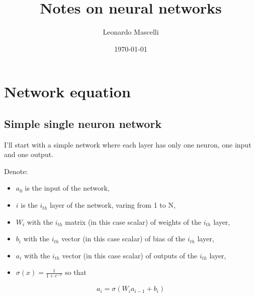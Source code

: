 \documentclass[11pt]{article}
\author{Leonardo Mascelli}
\date{\today}
\title{Notes on neural networks}
\begin{document}
\maketitle
\tableofcontents

\section{Network equation}
\label{sec:org2926c36}
\subsection{Simple single neuron network}
\label{sec:org4fa91bc}

I'll start with a simple network where each layer has only one neuron, one input and one output.

\hfill

Denote:
\begin{itemize}
\item \(a_0\) is the input of the network,
\item \(i\) is the \(i_{th}\) layer of the network, varing from 1 to N,
\item \(W_i\) with the \(i_{th}\) matrix (in this case scalar) of weights of the \(i_{th}\) layer,
\item \(b_i\) with the \(i_{th}\) vector (in this case scalar) of bias of the \(i_{th}\) layer,
\item \(a_i\) with the \(i_{th}\) vector (in this case scalar) of outputs of the \(i_{th}\) layer,
\item \(\sigma(x) = \frac{1}{1+e^{-x}}\) so that
\end{itemize}

\begin{equation}
  a_i = \sigma(W_ia_{i-1}+b_i)
\end{equation}
\end{document}

